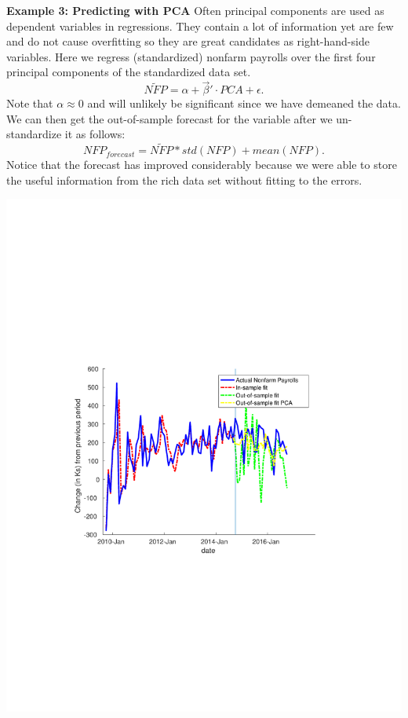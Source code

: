 \documentclass[11pt]{article}
\theoremstyle{definition}
\begin{document}
\begin{itemize}
\begin{shaded}
\textbf{Example 3: Predicting with PCA} \newline
Often principal components are used as dependent variables in regressions. They contain a lot of information yet are few and do not cause overfitting so they are great candidates as right-hand-side variables. Here we regress (standardized) nonfarm payrolls over the first four principal components of the standardized data set.
$$\tilde{NFP} = \alpha + \vec{\beta}'\cdot PCA + \epsilon.$$ 
Note that $\alpha \approx 0$ and will unlikely be significant since we have demeaned the data. We can then get the out-of-sample forecast for the variable after we un-standardize it as follows:
$$NFP_{forecast} = \tilde{NFP}*std(NFP)+mean(NFP).$$
Notice that the forecast has improved considerably because we were able to store the useful information from the rich data set without fitting to the errors.
\begin{center}
\includegraphics[scale=0.6,trim={0cm, 8cm, 0cm, 8cm}, clip]{plots/cursefitPCA.pdf}
\end{center}
\end{shaded}			


\end{itemize}
\end{document}
